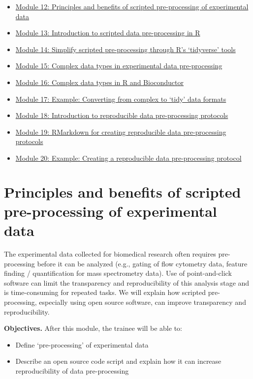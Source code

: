 \documentclass[]{tufte-book}
\providecommand{\tightlist}{%
  \setlength{\itemsep}{0pt}\setlength{\parskip}{0pt}}
\begin{document}
\begin{itemize}
\tightlist
\item
  \protect\hyperlink{module12}{Module 12: Principles and benefits of scripted pre-processing of experimental data}
\item
  \protect\hyperlink{module13}{Module 13: Introduction to scripted data pre-processing in R}
\item
  \protect\hyperlink{module14}{Module 14: Simplify scripted pre-processing through R's `tidyverse' tools}
\item
  \protect\hyperlink{module15}{Module 15: Complex data types in experimental data pre-processing}
\item
  \protect\hyperlink{module16}{Module 16: Complex data types in R and Bioconductor}
\item
  \protect\hyperlink{module17}{Module 17: Example: Converting from complex to `tidy' data formats}
\item
  \protect\hyperlink{module18}{Module 18: Introduction to reproducible data pre-processing protocols}
\item
  \protect\hyperlink{module19}{Module 19: RMarkdown for creating reproducible data pre-processing protocols}
\item
  \protect\hyperlink{module20}{Module 20: Example: Creating a reproducible data pre-processing protocol}
\end{itemize}

\hypertarget{module12}{%
\section{Principles and benefits of scripted pre-processing of experimental data}\label{module12}}

The experimental data collected for biomedical research often requires
pre-processing before it can be analyzed (e.g., gating of flow cytometry data,
feature finding / quantification for mass spectrometry data). Use of
point-and-click software can limit the transparency and reproducibility of this
analysis stage and is time-consuming for repeated tasks. We will explain how
scripted pre-processing, especially using open source software, can improve
transparency and reproducibility.

\textbf{Objectives.} After this module, the trainee will be able to:

\begin{itemize}
\tightlist
\item
  Define `pre-processing' of experimental data
\item
  Describe an open source code script and explain how it can increase
  reproducibility of data pre-processing
\end{itemize}
\end{document}
